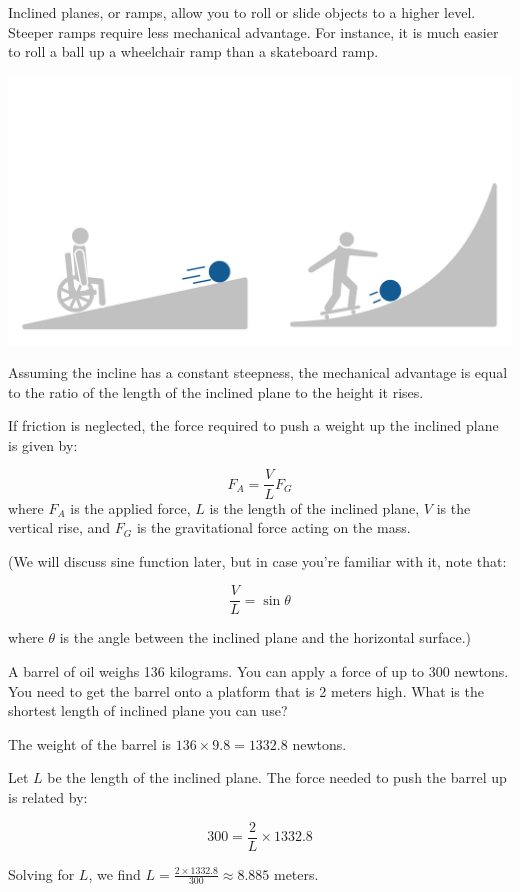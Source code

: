 Inclined planes, or ramps, allow you to roll or slide objects to a higher level. Steeper ramps require less mechanical advantage. For instance, it is much easier to roll a ball up a wheelchair ramp than a skateboard ramp.

\includegraphics[width=\textwidth]{rampcomparison.png}

Assuming the incline has a constant steepness, the mechanical advantage is equal to the ratio of the length of the inclined plane to the height it rises.

If friction is neglected, the force required to push a weight up the inclined plane is given by:

\[
F_A = \frac{V}{L} F_G
\]
where \( F_A \) is the applied force, \( L \) is the length of the inclined plane, \( V \) is the vertical rise, and \( F_G \) is the gravitational force acting on the mass.

(We will discuss sine function later, but in case you're familiar with it, note that:

\[
\frac{V}{L} = \sin{\theta}
\]

where \( \theta \) is the angle between the inclined plane and the horizontal surface.)

\begin{Exercise}[title={Ramp}, label=ramp]
A barrel of oil weighs 136 kilograms. You can apply a force of up to 300 newtons. You need to get the barrel onto a platform that is 2 meters high. What is the shortest length of inclined plane you can use?
\end{Exercise}
\begin{Answer}[ref=ramp]
The weight of the barrel is \( 136 \times 9.8 = 1332.8 \) newtons.

Let \( L \) be the length of the inclined plane. The force needed to push the barrel up is related by:

\[
300 = \frac{2}{L} \times 1332.8
\]

Solving for \( L \), we find \( L = \frac{2 \times 1332.8}{300} \approx 8.885 \) meters.
\end{Answer}

